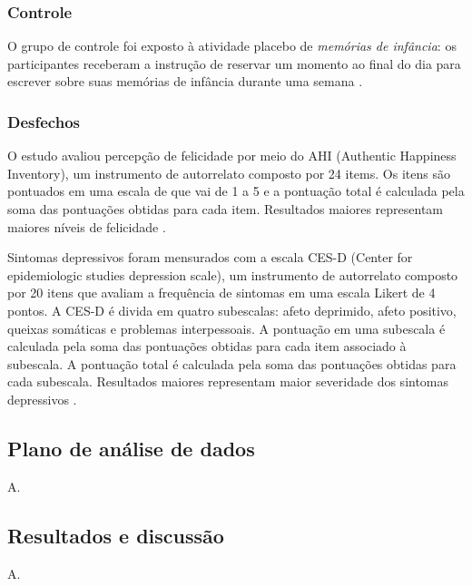 \subsubsection{Controle}

O grupo de controle foi exposto à atividade placebo de \emph{memórias de infância}: os participantes receberam a instrução de reservar um momento ao
final do dia para escrever sobre suas memórias de infância durante uma semana \cite{Woodworth2017}.

\subsubsection{Desfechos}

O estudo avaliou percepção de felicidade por meio do AHI (Authentic Happiness Inventory), um instrumento de autorrelato composto por 24 items. Os itens
são pontuados em uma escala de que vai de 1 a 5 e a pontuação total é calculada pela soma das pontuações obtidas para cada item. Resultados maiores representam
maiores níveis de felicidade \cite{Park2010}.

Sintomas depressivos foram mensurados com a escala CES-D (Center for epidemiologic studies depression scale), um instrumento de autorrelato composto por 20
itens que avaliam a frequência de sintomas em uma escala Likert de 4 pontos. A CES-D é divida em quatro subescalas: afeto deprimido, afeto positivo, queixas
somáticas e problemas interpessoais. A pontuação em uma subescala é calculada pela soma das pontuações obtidas para cada item associado à subescala. A pontuação
total é calculada pela soma das pontuações obtidas para cada subescala. Resultados maiores representam maior severidade dos sintomas depressivos \cite{Radloff1977}.

\subsection{Plano de análise de dados}

A.

\subsection{Resultados e discussão}

A.
